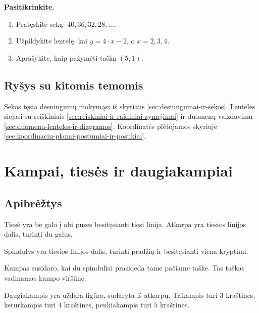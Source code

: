 \textbf{Pasitikrinkite.}
\begin{enumerate}[label=\arabic*.]
\item Pratęskite seką: \(40,36,32,28,\ldots\).
\item Užpildykite lentelę, kai \(y=4\cdot x-2\), o \(x=2,3,4\).
\item Aprašykite, kaip pažymėti tašką \((5;1)\).
\end{enumerate}

\subsection{Ryšys su kitomis temomis}

Sekos tęsia dėsningumų mokymąsi iš skyriaus \ref{sec:desningumai-ir-sekos}. Lentelės siejasi su reiškiniais \ref{sec:reiskiniai-ir-raidiniai-zymejimai} ir duomenų vaizdavimu \ref{sec:duomenu-lenteles-ir-diagramos}. Koordinatės plėtojamos skyriuje \ref{sec:koordinaciu-planai-postumiai-ir-posukiai}.

\section{Kampai, tiesės ir daugiakampiai}\label{sec:kampai-tieses-ir-daugiakampiai}

\subsection{Apibrėžtys}

\begin{apibreztis}
Tiesė yra be galo į abi puses besitęsianti tiesi linija. Atkarpa yra tiesios linijos dalis, turinti du galus.
\end{apibreztis}

\begin{apibreztis}
Spindulys yra tiesios linijos dalis, turinti pradžią ir besitęsianti viena kryptimi.
\end{apibreztis}

\begin{apibreztis}
Kampas susidaro, kai du spinduliai prasideda tame pačiame taške. Tas taškas vadinamas kampo viršūne.
\end{apibreztis}

\begin{apibreztis}
Daugiakampis yra uždara figūra, sudaryta iš atkarpų. Trikampis turi \(3\) kraštines, keturkampis turi \(4\) kraštines, penkiakampis turi \(5\) kraštines.
\end{apibreztis}

